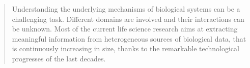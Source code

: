 
\begin{quotation}
\noindent
Understanding the underlying mechanisms of biological systems can be a challenging task. Different domains are involved and their interactions can be unknown.
Most of the current life science research aims at extracting meaningful information from heterogeneous sources of biological data, that is continuously increasing in size, thanks to the remarkable technological progresses of the last decades.

\end{quotation}
